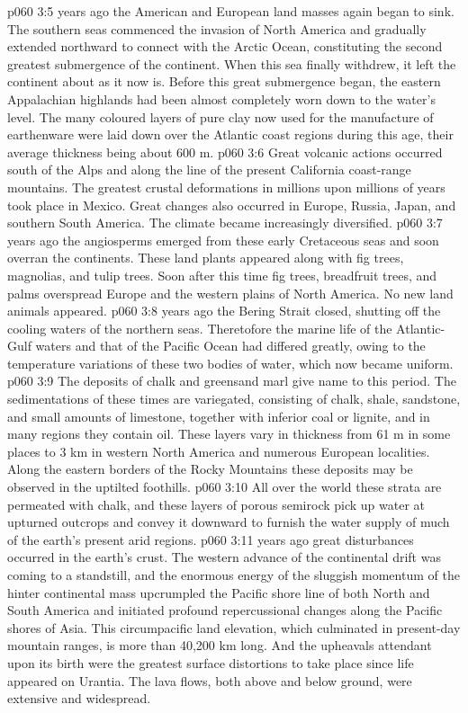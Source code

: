 \vs p060 3:5 \pc {} years ago the American and European land masses again began to sink. The southern seas commenced the invasion of North America and gradually extended northward to connect with the Arctic Ocean, constituting the second greatest submergence of the continent. When this sea finally withdrew, it left the continent about as it now is. Before this great submergence began, the eastern Appalachian highlands had been almost completely worn down to the water’s level. The many coloured layers of pure clay now used for the manufacture of earthenware were laid down over the Atlantic coast regions during this age, their average thickness being about 600 m.
\vs p060 3:6 Great volcanic actions occurred south of the Alps and along the line of the present California coast\hyp{}range mountains. The greatest crustal deformations in millions upon millions of years took place in Mexico. Great changes also occurred in Europe, Russia, Japan, and southern South America. The climate became increasingly diversified.
\vs p060 3:7 \pc {} years ago the angiosperms emerged from these early Cretaceous seas and soon overran the continents. These land plants  appeared along with fig trees, magnolias, and tulip trees. Soon after this time fig trees, breadfruit trees, and palms overspread Europe and the western plains of North America. No new land animals appeared.
\vs p060 3:8 \pc {} years ago the Bering Strait closed, shutting off the cooling waters of the northern seas. Theretofore the marine life of the Atlantic\hyp{}Gulf waters and that of the Pacific Ocean had differed greatly, owing to the temperature variations of these two bodies of water, which now became uniform.
\vs p060 3:9 The deposits of chalk and greensand marl give name to this period. The sedimentations of these times are variegated, consisting of chalk, shale, sandstone, and small amounts of limestone, together with inferior coal or lignite, and in many regions they contain oil. These layers vary in thickness from 61 m in some places to 3 km in western North America and numerous European localities. Along the eastern borders of the Rocky Mountains these deposits may be observed in the uptilted foothills.
\vs p060 3:10 All over the world these strata are permeated with chalk, and these layers of porous semirock pick up water at upturned outcrops and convey it downward to furnish the water supply of much of the earth’s present arid regions.
\vs p060 3:11 \pc {} years ago great disturbances occurred in the earth’s crust. The western advance of the continental drift was coming to a standstill, and the enormous energy of the sluggish momentum of the hinter continental mass upcrumpled the Pacific shore line of both North and South America and initiated profound repercussional changes along the Pacific shores of Asia. This circumpacific land elevation, which culminated in present\hyp{}day mountain ranges, is more than 40,200 km long. And the upheavals attendant upon its birth were the greatest surface distortions to take place since life appeared on Urantia. The lava flows, both above and below ground, were extensive and widespread.
